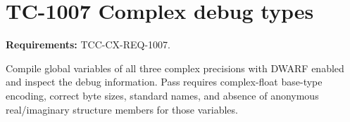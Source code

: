 \documentclass{article}
\begin{document}
\section*{TC-1007 Complex debug types}
\textbf{Requirements:} TCC-CX-REQ-1007.

Compile global variables of all three complex precisions with DWARF enabled
and inspect the debug information. Pass requires complex-float base-type
encoding, correct byte sizes, standard names, and absence of anonymous
real/imaginary structure members for those variables.
\end{document}

